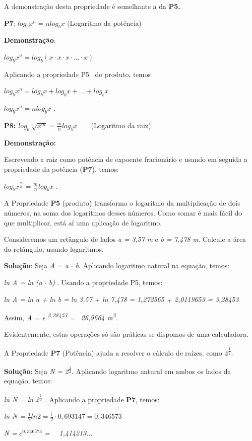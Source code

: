 \quad A demonstração desta propriedade é semelhante a da\textbf{ P5.}

\textbf{P7}:  \( log_{b}x^{n}=nlog_{b}x \) \quad \quad (Logaritmo da potência)

\textbf{Demonstração}:

\quad \quad  \( log_{b}x^{n}=log_{b} \left( x \cdot x \cdot x \cdot  \ldots  \cdot x \right)  \) \quad 

Aplicando a propriedade P5~ do produto, temos

\quad \quad  \( log_{b}x^{n}=log_{b}x+ log_{b}x+  \ldots +log_{b}x \) 

\quad \quad  \( log_{b}x^{n}=nlog_{b}x \) .

\textbf{P8: \quad   \( log_{b}\sqrt[n]{x^{m}}=\frac{m}{n}log_{b}x \) }~  ~ (Logaritmo da raiz)

\textbf{Demonstração:}

Escrevendo a raiz como potência de expoente fracionário e usando em seguida a propriedade da potência (\textbf{P7}), temos: 

\quad   \( log_{b}x^{\frac{m}{n}}=\frac{m}{n}log_{b}x \) .

\begin{texemplo}
    A Propriedade \textbf{P5} (produto) transforma o logaritmo da multiplicação de dois números, na soma dos logaritmos desses números. Como somar é mais fácil do que multiplicar, está aí uma aplicação de logaritmo.

    Consideremos um retângulo de lados \textit{a = 3,57 m} e \textit{b = 7,478 m}. Calcule a área do retângulo, usando logaritmos.

    \textbf{Solução}: Seja \textit{A = a $ \cdot $  b}. Aplicando logaritmo natural na equação, temos:

    \textit{ln A = ln (a }$ \cdot $  \textit{b)} . Usando a propriedade P5, temos:

    \textit{ln A = ln a + ln b =} \textit{ln 3,57 + ln 7,478 = 1,272565 + 2,0119653 = 3,28453}

    Assim, \textit{ A = e \textsuperscript{3,28453 }=~ 26,9664 m\textsuperscript{2}.}

    Evidentemente, estas operações só são práticas se dispomos de uma calculadora.
\end{texemplo}

\begin{texemplo}
    A Propriedade \textbf{P7} (Potência) ajuda a resolver o cálculo de raízes, como \textit{2\textsuperscript{$\frac{1}{2}$}}.

    \textbf{Solução}: Seja \textit{N = 2\textsuperscript{$\frac{1}{2}$}}. Aplicando logaritmo natural em ambos os lados da equação, temos:

    \textit{ln N = ln} \textit{2\textsuperscript{$\frac{1}{2}$} . }Aplicando a propriedade \textbf{P7}, temos:

    \textit{ln N =  \( \frac{1}{2}ln2=\frac{1}{2} \cdot 0,693147=0,346573 \) }~ 

    \textit{N =}  \( e^{0,346573} \)  \textit{=~~ 1,414213...} 

\end{texemplo}

